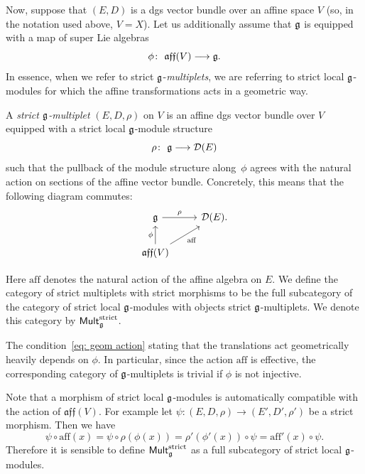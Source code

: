 \documentclass[11pt]{article}
\numberwithin{equation}{section}
\numberwithin{equation}{section}
\def\cat#1{\ensuremath{\mathsf{#1}}}
\DeclareMathOperator{\Mult}{\cat{Mult}}
\def\lie#1{\ensuremath{\mathfrak{#1}}}
\def\aff{\ensuremath{\lie{aff}}}
\begin{document}
Now, suppose that $(E,D)$ is a dgs vector bundle over an affine space $V$ (so, in the notation used above, $V=X$). Let us additionally assume that $\mathfrak g$ is equipped with a map of super Lie algebras
\begin{equation*}
\phi \colon \ \aff(V) \longrightarrow \fg .
\end{equation*}
In essence, when we refer to strict $\mathfrak g$-\emph{multiplets}, we are referring to strict local $\mathfrak g$-modules for which the affine transformations acts in a geometric way.
\begin{dfn}
	A \emph{strict $\mathfrak g$-multiplet} $(E,D,\rho)$ on $V$ is an affine dgs vector bundle over $V$ equipped with a strict local $\mathfrak g$-module structure
	\begin{equation*}
	\rho \colon \ \mathfrak g \longrightarrow \mathcal D(E)
	\end{equation*}
	such that the pullback of the module structure along~$\phi$ agrees with the natural action on sections of the affine vector bundle. Concretely, this means that the following diagram commutes:
	\begin{equation} \label{eq: geom action}
	\begin{tikzcd}
	\fg \arrow[r, "\rho"] & \cD(E). \\
	\aff(V) \arrow[ru, "\mathrm{aff}" '] \arrow[u,"\phi"]
	\end{tikzcd}
	\end{equation}
\end{dfn}
Here $\mathrm{aff}$ denotes the natural action of the affine algebra on $E$.
We define the category of strict multiplets with strict morphisms to be the full subcategory of the category of strict local $\mathfrak g$-modules with objects strict $\mathfrak g$-multiplets. We denote this category by $\Mult_{\fg}^{\mathrm{strict}}$.
%
\begin{rmk}
	The condition~\eqref{eq: geom action} stating that the translations act geometrically heavily depends on $\phi$. In particular, since the action $\mathrm{aff}$ is effective, the corresponding category of $\mathfrak g$-multiplets is trivial if $\phi$ is not injective.
\end{rmk}
\begin{rmk}
	Note that a morphism of strict local $\mathfrak g$-modules is automatically compatible with the action of $\aff(V)$. For example let $\psi \colon (E,D,\rho) \longrightarrow (E',D',\rho')$ be a strict morphism. Then we have
	\begin{equation*}
	\psi \circ \mathrm{aff}(x) = \psi \circ \rho(\phi(x)) = \rho'(\phi'(x)) \circ \psi = \mathrm{aff}'(x) \circ \psi .
	\end{equation*}
	Therefore it is sensible to define $\Mult_\fg^{\text{strict}}$ as a full subcategory of strict local $\mathfrak g$-modules.
\end{rmk}
%
\end{document}
